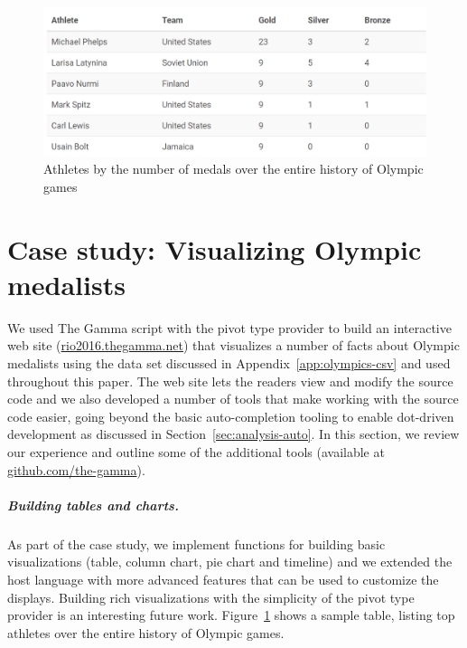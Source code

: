 \documentclass[a4paper,UKenglish]{lipics-v2016}
\theoremstyle{plain}
\theoremstyle{definition}
\begin{document}

\begin{figure}[b]
\vspace{1em}
\begin{center}
\includegraphics[scale=0.42,trim=0mm 0mm 0mm 0mm,clip]{images/table2.png} %
\end{center}
\caption{Athletes by the number of medals over the entire history of Olympic games}
\label{fig:case-table}
\end{figure}


\section{Case study: Visualizing Olympic medalists}
\label{sec:impl}

We used The Gamma script with the pivot type provider to build an interactive web site 
(\url{rio2016.thegamma.net}) that visualizes a number of facts about Olympic medalists 
using the data set discussed in Appendix~\ref{app:olympics-csv} and used throughout this paper.
The web site lets the readers view and modify the source code and we also developed a number of
tools that make working with the source code easier, going beyond the basic auto-completion tooling
to enable dot-driven development as discussed in Section~\ref{sec:analysis-auto}. In this section,
we review our experience and outline some of the additional tools (available at 
\url{github.com/the-gamma}).

\subparagraph{Building tables and charts.} 
As part of the case study, we implement functions for building basic visualizations 
(table, column chart, pie chart and timeline) and we extended the host language with more advanced 
features that can be used to customize the displays. Building rich visualizations with the 
simplicity of the pivot type provider is an interesting future work. Figure~\ref{fig:case-table} 
shows a sample table, listing top athletes over the entire history of Olympic games.
\end{document}
